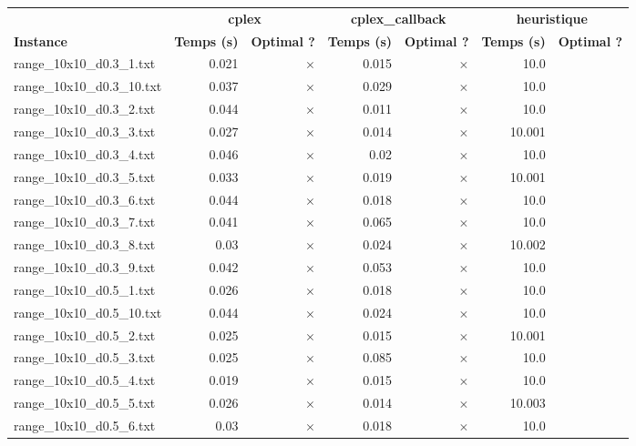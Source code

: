 \documentclass{article}
\begin{document}
\begin{center}
\renewcommand{\arraystretch}{1.4} 
 \begin{tabular}{lrrrrrr}
	\hline
 & \multicolumn{2}{c}{\textbf{cplex}} & \multicolumn{2}{c}{\textbf{cplex_callback}} & \multicolumn{2}{c}{\textbf{heuristique}}\\
\textbf{Instance}  & \textbf{Temps (s)} & \textbf{Optimal ?}  & \textbf{Temps (s)} & \textbf{Optimal ?}  & \textbf{Temps (s)} & \textbf{Optimal ?} \\\hline

range\_10x10\_d0.3\_1.txt & 0.021 & 
$\times$
 & 0.015 & 
$\times$
 & 10.0 & 
\\
range\_10x10\_d0.3\_10.txt & 0.037 & 
$\times$
 & 0.029 & 
$\times$
 & 10.0 & 
\\
range\_10x10\_d0.3\_2.txt & 0.044 & 
$\times$
 & 0.011 & 
$\times$
 & 10.0 & 
\\
range\_10x10\_d0.3\_3.txt & 0.027 & 
$\times$
 & 0.014 & 
$\times$
 & 10.001 & 
\\
range\_10x10\_d0.3\_4.txt & 0.046 & 
$\times$
 & 0.02 & 
$\times$
 & 10.0 & 
\\
range\_10x10\_d0.3\_5.txt & 0.033 & 
$\times$
 & 0.019 & 
$\times$
 & 10.001 & 
\\
range\_10x10\_d0.3\_6.txt & 0.044 & 
$\times$
 & 0.018 & 
$\times$
 & 10.0 & 
\\
range\_10x10\_d0.3\_7.txt & 0.041 & 
$\times$
 & 0.065 & 
$\times$
 & 10.0 & 
\\
range\_10x10\_d0.3\_8.txt & 0.03 & 
$\times$
 & 0.024 & 
$\times$
 & 10.002 & 
\\
range\_10x10\_d0.3\_9.txt & 0.042 & 
$\times$
 & 0.053 & 
$\times$
 & 10.0 & 
\\
range\_10x10\_d0.5\_1.txt & 0.026 & 
$\times$
 & 0.018 & 
$\times$
 & 10.0 & 
\\
range\_10x10\_d0.5\_10.txt & 0.044 & 
$\times$
 & 0.024 & 
$\times$
 & 10.0 & 
\\
range\_10x10\_d0.5\_2.txt & 0.025 & 
$\times$
 & 0.015 & 
$\times$
 & 10.001 & 
\\
range\_10x10\_d0.5\_3.txt & 0.025 & 
$\times$
 & 0.085 & 
$\times$
 & 10.0 & 
\\
range\_10x10\_d0.5\_4.txt & 0.019 & 
$\times$
 & 0.015 & 
$\times$
 & 10.0 & 
\\
range\_10x10\_d0.5\_5.txt & 0.026 & 
$\times$
 & 0.014 & 
$\times$
 & 10.003 & 
\\
range\_10x10\_d0.5\_6.txt & 0.03 & 
$\times$
 & 0.018 & 
$\times$
 & 10.0 & 
\\

\end{tabular}
\end{center}
\end{document}
